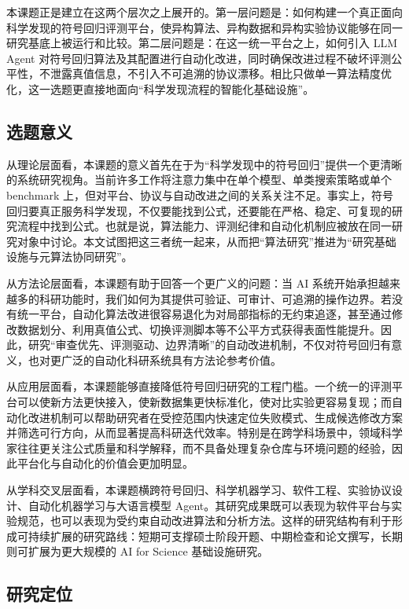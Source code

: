 \documentclass[UTF8,12pt]{ctexart}
\begin{document}
本课题正是建立在这两个层次之上展开的。第一层问题是：如何构建一个真正面向科学发现的符号回归评测平台，使异构算法、异构数据和异构实验协议能够在同一研究基底上被运行和比较。第二层问题是：在这一统一平台之上，如何引入 LLM Agent 对符号回归算法及其配置进行自动化改进，同时确保改进过程不破坏评测公平性，不泄露真值信息，不引入不可追溯的协议漂移。相比只做单一算法精度优化，这一选题更直接地面向“科学发现流程的智能化基础设施”。

\subsection{选题意义}

从理论层面看，本课题的意义首先在于为“科学发现中的符号回归”提供一个更清晰的系统研究视角。当前许多工作将注意力集中在单个模型、单类搜索策略或单个 benchmark 上，但对平台、协议与自动改进之间的关系关注不足。事实上，符号回归要真正服务科学发现，不仅要能找到公式，还要能在严格、稳定、可复现的研究流程中找到公式。也就是说，算法能力、评测纪律和自动化机制应被放在同一研究对象中讨论。本文试图把这三者统一起来，从而把“算法研究”推进为“研究基础设施与元算法协同研究”。

从方法论层面看，本课题有助于回答一个更广义的问题：当 AI 系统开始承担越来越多的科研功能时，我们如何为其提供可验证、可审计、可追溯的操作边界。若没有统一平台，自动化算法改进很容易退化为对局部指标的无约束追逐，甚至通过修改数据划分、利用真值公式、切换评测脚本等不公平方式获得表面性能提升。因此，研究“审查优先、评测驱动、边界清晰”的自动改进机制，不仅对符号回归有意义，也对更广泛的自动化科研系统具有方法论参考价值。

从应用层面看，本课题能够直接降低符号回归研究的工程门槛。一个统一的评测平台可以使新方法更快接入，使新数据集更快标准化，使对比实验更容易复现；而自动化改进机制可以帮助研究者在受控范围内快速定位失败模式、生成候选修改方案并筛选可行方向，从而显著提高科研迭代效率。特别是在跨学科场景中，领域科学家往往更关注公式质量和科学解释，而不具备处理复杂仓库与环境问题的经验，因此平台化与自动化的价值会更加明显。

从学科交叉层面看，本课题横跨符号回归、科学机器学习、软件工程、实验协议设计、自动化机器学习与大语言模型 Agent。其研究成果既可以表现为软件平台与实验规范，也可以表现为受约束自动改进算法和分析方法。这样的研究结构有利于形成可持续扩展的研究路线：短期可支撑硕士阶段开题、中期检查和论文撰写，长期则可扩展为更大规模的 AI for Science 基础设施研究。

\subsection{研究定位}
\end{document}
